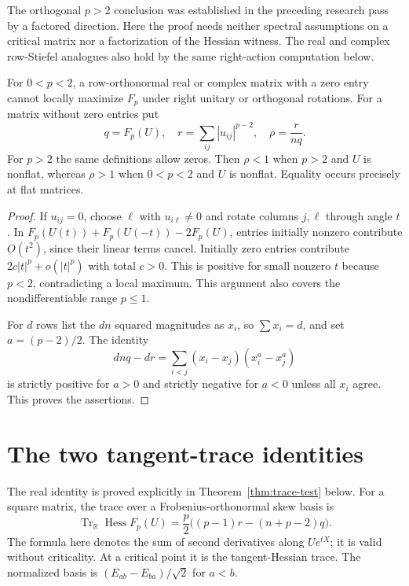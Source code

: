 The orthogonal $p>2$ conclusion was established in the preceding
research pass by a factored direction. Here the proof needs neither
spectral assumptions on a critical matrix nor a factorization of the
Hessian witness. The real and complex row-Stiefel analogues also hold
by the same right-action computation below.

\begin{lemma}\label{lem:moments}
For $0<p<2$, a row-orthonormal real or complex matrix with a zero entry
cannot locally maximize $F_p$ under right unitary or orthogonal
rotations. For a matrix without zero entries put
\[
 q=F_p(U),\quad r=\sum_{ij}|u_{ij}|^{p-2},\quad \rho=\frac{r}{nq}.
\]
For $p>2$ the same definitions allow zeros. Then $\rho<1$ when
$p>2$ and $U$ is nonflat, whereas $\rho>1$ when $0<p<2$ and $U$ is
nonflat. Equality occurs precisely at flat matrices.
\end{lemma}
\begin{proof}
If $u_{ij}=0$, choose $\ell$ with $u_{i\ell}\ne0$ and rotate columns
$j,\ell$ through angle $t$. In
$F_p(U(t))+F_p(U(-t))-2F_p(U)$, entries initially nonzero contribute
$O(t^2)$, since their linear terms cancel. Initially zero entries
contribute $2c|t|^p+o(|t|^p)$ with total $c>0$. This is positive for
small nonzero $t$ because $p<2$, contradicting a local maximum.
This argument also covers the nondifferentiable range $p\le1$.

For $d$ rows list the $dn$ squared magnitudes as $x_i$, so
$\sum x_i=d$, and set $a=(p-2)/2$. The identity
\[
 dnq-dr=\sum_{i<j}(x_i-x_j)(x_i^a-x_j^a)
\]
is strictly positive for $a>0$ and strictly negative for $a<0$
unless all $x_i$ agree. This proves the assertions.
\end{proof}

\section{The two tangent-trace identities}
The real identity is proved explicitly in
Theorem~\ref{thm:trace-test} below. For a square matrix, the trace over
a Frobenius-orthonormal skew basis is
\begin{equation}\label{eq:real-trace}
 \operatorname{Tr}_{\mathbb R}\operatorname{Hess}F_p(U)
 =\frac p2\big((p-1)r-(n+p-2)q\big).
\end{equation}
The formula here denotes the sum of second derivatives along
$Ue^{tX}$; it is valid without criticality. At a critical point it
is the tangent-Hessian trace. The normalized basis is
$(E_{ab}-E_{ba})/\sqrt2$ for $a<b$.


